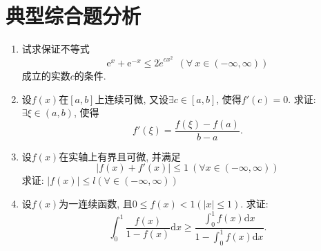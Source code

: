 \chapter{典型综合题分析}
\begin{enumerate}
	\item 试求保证不等式
		$$ \mathrm{e}^x+\mathrm{e}^{-x} \le 2\mathring{e}^{cx^2}\ \ (\forall\  x\in (-\infty,\infty))$$成立的实数$c$的条件.
	\item 设$f(x)$在$[a,b]$上连续可微, 又设$\exists c\in [a,b]$, 使得$f'(c)=0$. 求证:
	$\exists \xi \in(a,b)$, 使得
	$$ f'(\xi) = \frac{f(\xi)-f(a)}{b-a}.$$
	\item 设$f(x)$在实轴上有界且可微, 并满足
	$$ |f(x)+f'(x)|\le 1\ (\forall x\in (-\infty,\infty))$$
求证: $|f(x)|\le l(\forall \in(-\infty,\infty))$
\item 设$f(x)$为一连续函数, 且$0\le f(x)<1 (|x|\le 1)$. 求证:
$$ \displaystyle{\int_{0}^{1}\frac{f(x)}{1-f(x)}\mathrm{d}x}\ge \frac{\int_{0}^{1}f(x)\mathrm{d}x}{1-\int_{0}^{1}f(x)\mathrm{d}x}.$$


\end{enumerate}
